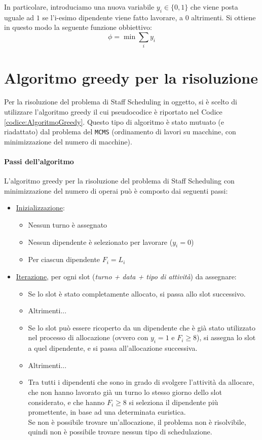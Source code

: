 \noindent
In particolare, introduciamo una nuova variabile $y_i \in \lbrace 0,1 \rbrace$ che viene posta uguale ad $1$ se l'i-esimo dipendente viene fatto lavorare, a $0$ altrimenti. Si ottiene in questo modo la seguente funzione obbiettivo:
\begin{equation}
	\phi = \min{\sum_{i} y_i}
\end{equation}
\section{Algoritmo greedy per la risoluzione}
Per la risoluzione del problema di Staff Scheduling in oggetto, si è scelto di utilizzare l'algoritmo greedy il cui pseudocodice è riportato nel Codice \ref{codice:AlgoritmoGreedy}. Questo tipo di algoritmo è stato mutuato (e riadattato) dal problema del \verb|MCMS| (ordinamento di lavori su macchine, con minimizzazione del numero di macchine).

\paragraph{Passi dell'algoritmo} L'algoritmo greedy per la risoluzione del problema di Staff Scheduling con minimizzazione del numero di operai può è composto dai seguenti passi:
\begin{itemize}
	\item \underline{Inizializzazione}:
		\begin{itemize}
			\item Nessun turno è assegnato
			\item Nessun dipendente è selezionato per lavorare ($y_i=0$)
			\item Per ciascun dipendente $F_i = L_i$
		\end{itemize}
	\item \underline{Iterazione}, per ogni slot (\textit{turno + data + tipo di attività}) da assegnare:
		\begin{itemize}
			\item Se lo slot è stato completamente allocato, si passa allo slot successivo.
			\item Altrimenti...
			\item Se lo slot può essere ricoperto da un dipendente che è già stato utilizzato nel processo di allocazione (ovvero con $y_i=1$ e $F_i \geq 8$), si assegna lo slot a quel dipendente, e si passa all'allocazione successiva.
			\item Altrimenti...
			\item Tra tutti i dipendenti che sono in grado di svolgere l'attività da allocare, che non hanno lavorato già un turno lo stesso giorno dello slot considerato, e che hanno $F_i \geq 8$ si seleziona il dipendente più promettente, in base ad una determinata euristica.\\
				Se non è possibile trovare un'allocazione, il problema non è risolvibile, quindi non è possibile trovare nessun tipo di schedulazione.
		\end{itemize}
\end{itemize}
